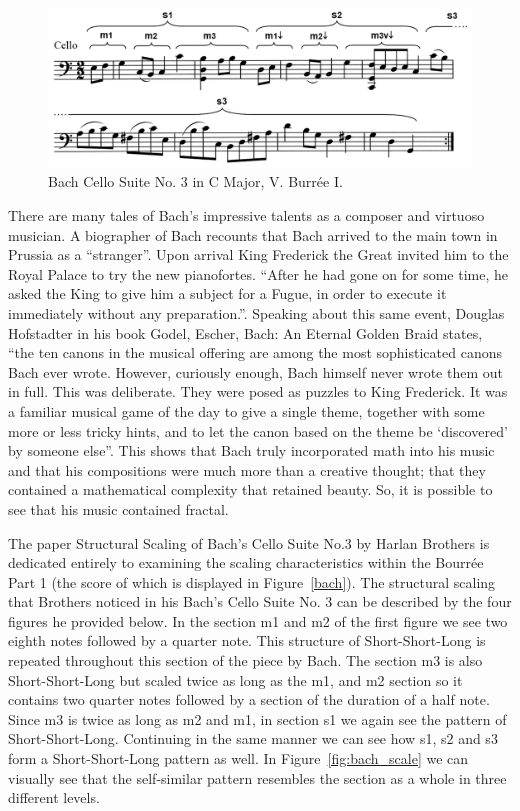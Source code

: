 \documentclass{article}
\begin{document}
\begin{figure}[ht!]
    \centering
    \includegraphics[width=\linewidth]{figures/bach_cello.png}
    \caption{%
        Bach Cello Suite No. 3 in C Major, V. Burrée I.
    }\label{fig:bach}
\end{figure}

There are many tales of Bach's impressive talents as a composer and virtuoso
musician. A biographer of Bach recounts that Bach arrived to the main  town in
Prussia as a “stranger”. Upon arrival King Frederick the Great invited him to
the Royal Palace to try the new pianofortes. ``After he had gone on for some
time, he asked the King to give him a subject for a Fugue, in order to execute
it immediately without any preparation.''\cite{6}. Speaking about this same event,
Douglas Hofstadter in his book Godel, Escher, Bach: An Eternal Golden Braid
states, ``the ten canons in the musical offering are among the most sophisticated
canons Bach ever wrote. However, curiously enough, Bach himself never wrote them
out in full. This was deliberate. They were posed as puzzles to King Frederick.
It was a familiar musical game of the day to give a single theme, together with
some more or less tricky hints, and to let the canon based on the theme be
`discovered' by someone else''\cite{7}. This shows that Bach truly incorporated math
into his music and that his compositions were much more than a creative thought;
that they contained a mathematical complexity that retained beauty. So, it is
possible to see that his music contained fractal.

The paper Structural Scaling of Bach’s Cello Suite No.3 by Harlan Brothers is
dedicated entirely to examining the scaling characteristics within the Bourrée
Part 1 (the score of which is displayed in Figure~\ref{bach}). The structural
scaling that Brothers noticed in his Bach’s Cello Suite No. 3 can be described
by the four figures he provided below. In the section m1 and m2 of the first
figure we see two eighth notes followed by a
quarter note. This structure of Short-Short-Long is repeated throughout this
section of the piece by Bach. The section m3 is also Short-Short-Long but scaled
twice as long as the m1, and m2 section so it contains two quarter notes
followed by a section of the duration of a half note. Since m3 is twice as long
as m2 and m1, in section s1 we again see the pattern of Short-Short-Long.
Continuing in the same manner we can see how s1, s2 and s3 form a
Short-Short-Long pattern as well. In Figure~\ref{fig:bach_scale} we can visually see
that the self-similar pattern resembles the section as a whole in three
different levels.
\end{document}
